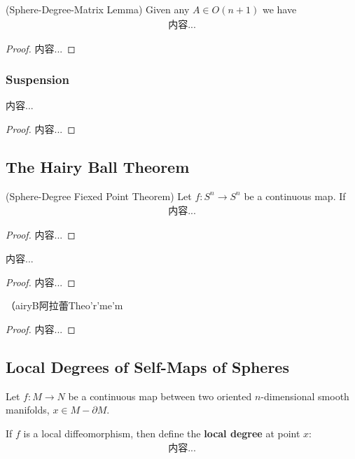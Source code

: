 \documentclass[Total.tex]{subfiles}
\begin{document}
				\begin{lemma}
					(Sphere-Degree-Matrix Lemma) Given any $A\in O(n+1)$ we have
					\begin{gather*}
						内容...
					\end{gather*}
				\end{lemma}
				\begin{proof}
					内容...
				\end{proof}
				\subsubsection{Suspension}
				\begin{lemma}
					内容...
				\end{lemma}
				\begin{proof}
					内容...
				\end{proof}
				
			\subsection{The Hairy Ball Theorem}
				\begin{theorem}
					(Sphere-Degree Fiexed Point Theorem) Let $f:S^n\rightarrow S^n$ be a continuous map. If 
					\begin{gather*}
						内容...
					\end{gather*}
				\end{theorem}
				\begin{proof}
					内容...
				\end{proof}
				
				\begin{proposition}
					内容...
				\end{proposition}
				\begin{proof}
					内容...
				\end{proof}
				
				\begin{theorem}
					（airyB阿拉蕾Theo'r'me'm
				\end{theorem}
				\begin{proof}
					内容...
				\end{proof}
			\subsection{Local Degrees of Self-Maps of Spheres}
				\begin{Def}
					Let $f:M\rightarrow N$ be a continuous map between two oriented $n$-dimensional smooth manifolds, $x\in M-\partial M$. 
					
					If $f$ is a local diffeomorphism, then define the \textbf{local degree} at point $x$:
					\begin{gather*}
						内容...
					\end{gather*}
				\end{Def}
\end{document}
